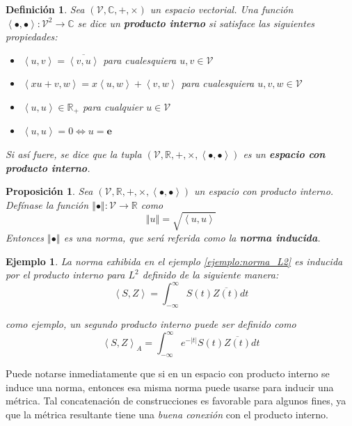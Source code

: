 \documentclass[12pt,letterpaper]{book}
\newtheorem{definicion}{Definición}[chapter]
\newtheorem{proposicion}[teorema]{Proposición}
\newtheorem{ejemplo}{Ejemplo}[chapter]
\newcommand{\R}{\mathbb{R}}
\newcommand{\C}{\mathbb{C}}
\newcommand{\intR}{\int_{-\infty}^{\infty}}
\newcommand{\abso}[1]{\left| #1 \right|}
\newcommand{\norma}[1]{\left\Vert #1 \right\Vert}
\newcommand{\producto}[1]{\left\langle #1 \right\rangle}
\begin{document}
\begin{definicion}
Sea $(\mathcal{V},\C,+,\times)$ un espacio vectorial. Una función $\producto{\bullet,\bullet} : \mathcal{V}^{2}\rightarrow \C$ se dice un \textbf{producto interno} si satisface las siguientes propiedades:
\begin{itemize}
\item $\producto{u,v} = \overline{\producto{v,u}}$ para cualesquiera $u,v \in \mathcal{V}$
\item $\producto{x u + v, w} = x \producto{u,w} + \producto{v,w}$ para cualesquiera $u,v,w \in \mathcal{V}$
\item $\producto{u,u} \in \R_+$ para cualquier $u \in \mathcal{V}$
\item $\producto{u,u} = 0 \Leftrightarrow u = \boldsymbol{e}$
\end{itemize}
Si así fuere, se dice que la tupla $(\mathcal{V},\R,+,\times, \producto{\bullet,\bullet})$ es un \textbf{espacio con producto interno}.
\end{definicion}

\begin{proposicion}
Sea $(\mathcal{V},\R,+,\times, \producto{\bullet,\bullet})$ un espacio con producto interno. Defínase la función $\norma{\bullet}: \mathcal{V} \rightarrow \R$ como
\begin{equation}
\norma{u} = \sqrt{\producto{u,u}}
\end{equation}
Entonces $\norma{\bullet}$ es una norma, que será referida como la \textbf{norma inducida}.
\end{proposicion}

\begin{ejemplo}
La norma exhibida en el ejemplo \ref{ejemplo:norma_L2} es inducida por el producto interno para $L^{2}$ definido de la siguiente manera:
\begin{equation}
\producto{S,Z} = \intR S(t) \overline{Z(t)} dt
\end{equation}

como ejemplo, un segundo producto interno puede ser definido como
\begin{equation}
\producto{S,Z}_A = \intR e^{-\abso{t}} S(t) \overline{Z(t)} dt
\end{equation}
\end{ejemplo}

Puede notarse inmediatamente que si en un espacio con producto interno se induce una norma, entonces esa misma norma puede usarse para inducir una métrica.
%
Tal concatenación de construcciones es favorable para algunos fines, ya que la métrica resultante tiene una \textit{buena conexión} con el producto interno.
\end{document}

